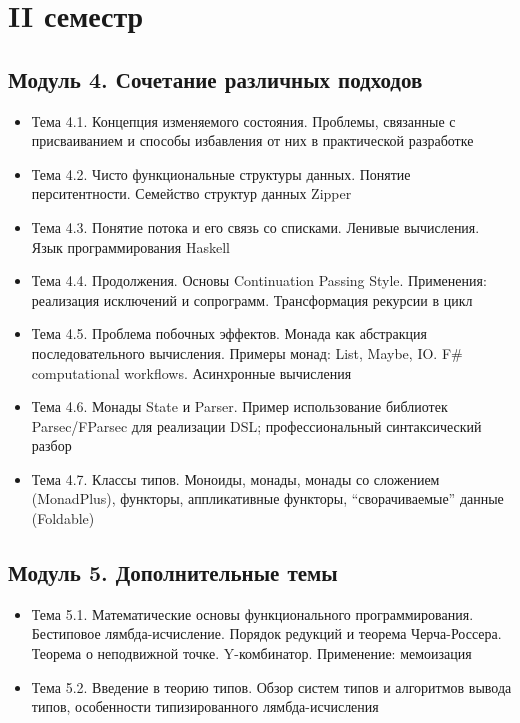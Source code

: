 \documentclass[a4paper,11pt]{article}
\begin{document}
\section*{II семестр}
\subsection*{Модуль 4. Сочетание различных подходов}
\begin{itemize}
\item Тема 4.1. Концепция изменяемого состояния. Проблемы, связанные с
присваиванием и способы избавления от них в практической разработке
\item Тема 4.2. Чисто функциональные структуры данных. Понятие перситентности.
Семейство структур данных Zipper
\item Тема 4.3. Понятие потока и его связь со списками. Ленивые вычисления. Язык
программирования Haskell
\item Тема 4.4. Продолжения. Основы Continuation Passing Style. Применения:
реализация исключений и сопрограмм. Трансформация рекурсии в цикл
\item Тема 4.5. Проблема побочных эффектов. Монада как абстракция
последовательного вычисления. Примеры монад: List, Maybe, IO.
F\# computational workflows. Асинхронные вычисления
\item Тема 4.6. Монады State и Parser. Пример использование библиотек
Parsec/FParsec для реализации DSL; профессиональный синтаксический разбор
\item Тема 4.7. Классы типов. Моноиды, монады, монады со сложением (MonadPlus),
функторы, аппликативные функторы, ``сворачиваемые'' данные (Foldable)
\end{itemize}
\subsection*{Модуль 5. Дополнительные темы}
\begin{itemize}
\item Тема 5.1. Математические основы функционального программирования.
Бестиповое лямбда-исчисление. Порядок редукций и теорема Черча-Россера.
Теорема о неподвижной точке. Y-комбинатор. Применение: мемоизация
\item Тема 5.2. Введение в теорию типов. Обзор систем типов и алгоритмов
вывода типов, особенности типизированного лямбда-исчисления
\end{itemize}
\end{document}

